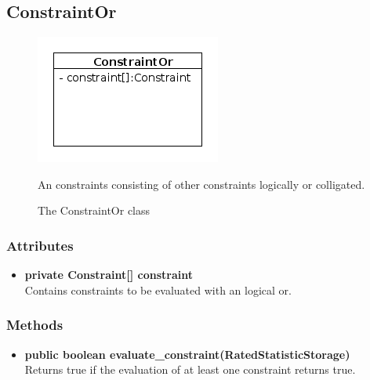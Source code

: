 \subsection{ConstraintOr}
\begin{figure}[htbp]
	\begin{minipage}[t]{8cm}
		\vspace{0pt}
		\centering
		\includegraphics[scale=0.6]{./diagram_pictures/reactor/ConstraintOr.png}
		\caption{The ConstraintOr class}
	\end{minipage}
	\hfill
	\begin{minipage}[t]{8cm}
		\vspace{10pt}
			An constraints consisting of other constraints logically or colligated.
	\end{minipage}
\end{figure}  

\subsubsection{Attributes}
\begin{itemize}
	\item \textbf{ private Constraint[] constraint }\\
	Contains constraints to be evaluated with an logical or.
\end{itemize}
\subsubsection{Methods}
\begin{itemize}
	\item \textbf{ public boolean evaluate\_constraint(RatedStatisticStorage) }\\
	Returns true if the evaluation of at least one constraint returns true.
\end{itemize}


\newpage
